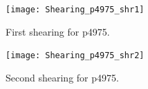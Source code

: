\documentclass[letterpaper,10pt]{article}
\begin{document}
\newpage

\begin{figure}[ht]
	\centering
	\texttt{[image: Shearing\_p4975\_shr1]}
	\caption{First shearing for p4975.}
	\label{fig:shr1_p4975}
\end{figure}

\newpage

\begin{figure}[ht]
	\centering
	\texttt{[image: Shearing\_p4975\_shr2]}
	\caption{Second shearing for p4975.}
	\label{fig:shr2_p4975}
\end{figure}

\end{document}
